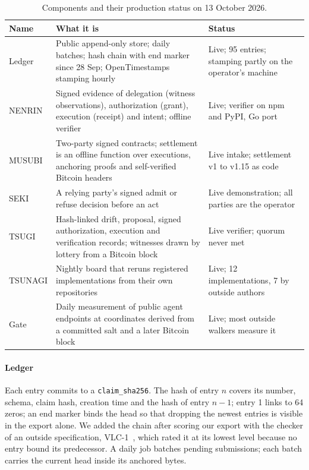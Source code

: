 \documentclass[preprint,12pt,authoryear]{elsarticle}
\newcommand{\code}[1]{\texttt{#1}}
\begin{document}
\begin{table}[t]
\centering
\caption{Components and their production status on 13 October 2026.}
\label{tab:gloss}
\small
\begin{tabularx}{\textwidth}{@{}l L L@{}}
\toprule
Name & What it is & Status \\
\midrule
Ledger & Public append-only store; daily batches; hash chain with end marker since 28 Sep; OpenTimestamps stamping hourly & Live; 95 entries; stamping partly on the operator's machine \\
NENRIN & Signed evidence of delegation (witness observations), authorization (grant), execution (receipt) and intent; offline verifier & Live; verifier on npm and PyPI, Go port \\
MUSUBI & Two-party signed contracts; settlement is an offline function over executions, anchoring proofs and self-verified Bitcoin headers & Live intake; settlement v1 to v1.15 as code \\
SEKI & A relying party's signed admit or refuse decision before an act & Live demonstration; all parties are the operator \\
TSUGI & Hash-linked drift, proposal, signed authorization, execution and verification records; witnesses drawn by lottery from a Bitcoin block & Live verifier; quorum never met \\
TSUNAGI & Nightly board that reruns registered implementations from their own repositories & Live; 12 implementations, 7 by outside authors \\
Gate & Daily measurement of public agent endpoints at coordinates derived from a committed salt and a later Bitcoin block & Live; most outside walkers measure it \\
\bottomrule
\end{tabularx}
\end{table}

\paragraph{Ledger} Each entry commits to a \code{claim\_sha256}. The hash of entry $n$ covers its number, schema, claim hash, creation time and the hash of entry $n-1$; entry 1 links to 64 zeros; an end marker binds the head so that dropping the newest entries is visible in the export alone. We added the chain after scoring our export with the checker of an outside specification, VLC-1~\citep{vlc1}, which rated it at its lowest level because no entry bound its predecessor. A daily job batches pending submissions; each batch carries the current head inside its anchored bytes.
\end{document}
